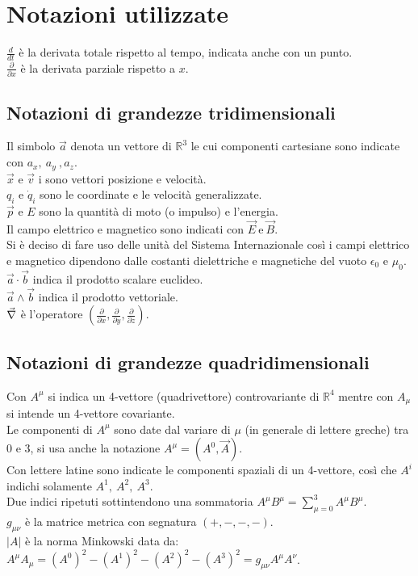 \section*{Notazioni utilizzate}
\vspace*{\fill}
$\frac{d}{dt}$ è la derivata totale rispetto al tempo, indicata anche con un punto.\\

$\frac{\partial}{\partial x}$ è la derivata parziale rispetto a $x$.\\
\subsection*{Notazioni di grandezze tridimensionali}
Il simbolo $\vec{a}$ denota un vettore di $\mathbb{R}^3$ le cui componenti cartesiane sono indicate con $a_x,\ a_y\ , a_z$.\\
$\vec{x}$ e $\vec{v}$ i sono vettori posizione e velocità.\\
$q_i$ e $\dot q_i$ sono le coordinate e le velocità generalizzate. \\
$\vec{p}$ e $E$ sono la quantità di moto (o impulso) e l'energia.\\
Il campo elettrico e magnetico sono indicati con $\vec{E}\ \text{e}\ \vec{B}$.\\
Si è deciso di fare uso delle unità del Sistema Internazionale così i campi elettrico e magnetico dipendono dalle costanti dielettriche e magnetiche del vuoto $\epsilon_0$ e $\mu_0$.\\
$\vec a\cdot\vec b$ indica il prodotto scalare euclideo.\\
$\vec a\wedge\vec b$ indica il prodotto vettoriale.\\
$\vec{\nabla}$ è l'operatore $(\frac{\partial}{\partial x},\frac{\partial}{\partial y},\frac{\partial}{\partial z})$.\\
\subsection*{Notazioni di grandezze quadridimensionali}
Con $A^\mu$ si indica un 4-vettore (quadrivettore) controvariante di $\mathbb{R}^4$ mentre con $A_\mu$ si intende un 4-vettore covariante.\\
Le componenti di $A^\mu$ sono date dal variare di $\mu$ (in generale di lettere greche) tra $0$ e $3$, si usa anche la notazione $A^\mu=(A^0,\vec{A})$.\\
Con lettere latine sono indicate le componenti spaziali di un 4-vettore, così che $A^i$ indichi solamente $A^1,\ A^2,\ A^3$.\\
Due indici ripetuti sottintendono una sommatoria $A^\mu B^\mu=\sum_{\mu=0}^{3} A^\mu B^\mu$.\\
$g_{\mu \nu}$ è la matrice metrica con segnatura $(+,-,-,-)$.\\
$|A|$ è la norma Minkowski data da: $A^\mu A_\mu=(A^0)^2-(A^1)^2-(A^2)^2-(A^3)^2=g_{\mu \nu}A^\mu A^\nu$.\\
